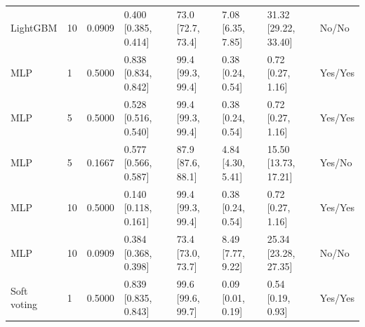 \begin{longtable}{llllllll}
LightGBM & 10 & 0.0909 & \shortstack{{0.400} \\ {[0.385, 0.414]}} & \shortstack{{73.0} \\ {[72.7, 73.4]}} & \shortstack{{7.08} \\ {[6.35, 7.85]}} & \shortstack{{31.32} \\ {[29.22, 33.40]}} & No/No \\
MLP & 1 & 0.5000 & \shortstack{{0.838} \\ {[0.834, 0.842]}} & \shortstack{{99.4} \\ {[99.3, 99.4]}} & \shortstack{{0.38} \\ {[0.24, 0.54]}} & \shortstack{{0.72} \\ {[0.27, 1.16]}} & Yes/Yes \\
MLP & 5 & 0.5000 & \shortstack{{0.528} \\ {[0.516, 0.540]}} & \shortstack{{99.4} \\ {[99.3, 99.4]}} & \shortstack{{0.38} \\ {[0.24, 0.54]}} & \shortstack{{0.72} \\ {[0.27, 1.16]}} & Yes/Yes \\
MLP & 5 & 0.1667 & \shortstack{{0.577} \\ {[0.566, 0.587]}} & \shortstack{{87.9} \\ {[87.6, 88.1]}} & \shortstack{{4.84} \\ {[4.30, 5.41]}} & \shortstack{{15.50} \\ {[13.73, 17.21]}} & Yes/No \\
MLP & 10 & 0.5000 & \shortstack{{0.140} \\ {[0.118, 0.161]}} & \shortstack{{99.4} \\ {[99.3, 99.4]}} & \shortstack{{0.38} \\ {[0.24, 0.54]}} & \shortstack{{0.72} \\ {[0.27, 1.16]}} & Yes/Yes \\
MLP & 10 & 0.0909 & \shortstack{{0.384} \\ {[0.368, 0.398]}} & \shortstack{{73.4} \\ {[73.0, 73.7]}} & \shortstack{{8.49} \\ {[7.77, 9.22]}} & \shortstack{{25.34} \\ {[23.28, 27.35]}} & No/No \\
Soft voting & 1 & 0.5000 & \shortstack{{0.839} \\ {[0.835, 0.843]}} & \shortstack{{99.6} \\ {[99.6, 99.7]}} & \shortstack{{0.09} \\ {[0.01, 0.19]}} & \shortstack{{0.54} \\ {[0.19, 0.93]}} & Yes/Yes \\

\end{longtable}
